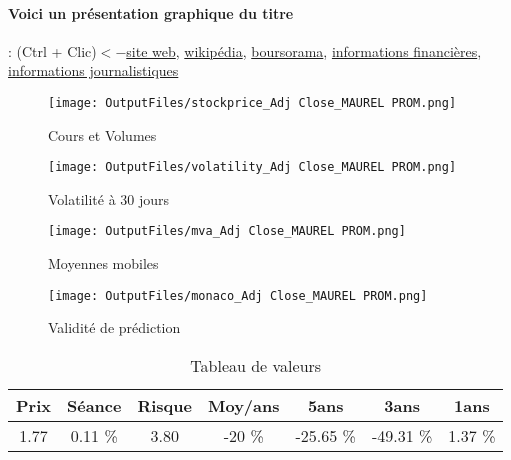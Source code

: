 \documentclass[11pt,a4paper]{report}%
\begin{document}
\paragraph{Voici un présentation graphique du titre} : (Ctrl + Clic)$<-$\href{https://www.maureletprom.fr/fr/}{site web}, \href{https://fr.wikipedia.org/wiki/Maurel_%26_Prom}{wikipédia}, \href{https://www.boursorama.com/cours/1rPMAU}{boursorama}, \href{https://www.qwant.com/?q=site:https:%2f%2fwww.easybourse.com%2faction-societe%2fMAUREL-PROM&t=web&client=ext-firefox-hp}{informations financières}, \href{https://bourse.lerevenu.com/cours-de-bourse/fiche-valeur-synthese/MAUREL-PROM/MAU-FR}{informations journalistiques}
\begin{figure}[!htb]
   \begin{minipage}{0.5\textwidth}
     \centering
     \texttt{[image: OutputFiles/stockprice\_Adj Close\_MAUREL PROM.png]}
     \caption{Cours et Volumes}\label{Fig:price_MAUREL PROM}
   \end{minipage}\hfill
   \begin{minipage}{0.5\textwidth}
     \centering
     \texttt{[image: OutputFiles/volatility\_Adj Close\_MAUREL PROM.png]}
     \caption{Volatilité à 30 jours}\label{Fig:volat_MAUREL PROM}
   \end{minipage}
\end{figure}
\begin{figure}[!htb]
   \begin{minipage}{0.5\textwidth}
     \centering
     \texttt{[image: OutputFiles/mva\_Adj Close\_MAUREL PROM.png]}
     \caption{Moyennes mobiles}\label{Fig:mva_MAUREL PROM}
   \end{minipage}\hfill
   \begin{minipage}{0.5\textwidth}
     \centering
     \texttt{[image: OutputFiles/monaco\_Adj Close\_MAUREL PROM.png]}
     \caption{Validité de prédiction}\label{Fig:prediction_MAUREL PROM}
   \end{minipage}
\end{figure}

\begin{table}[H]
  \centering
    \begin{tabular}{|c|c|c|c|c|c|c|}
    \hline
    Prix & Séance & Risque  & Moy/ans & 5ans & 3ans & 1ans \\
    \hline
    1.77 &    0.11 \%    & 3.80 & -20 \% & -25.65 \% & -49.31 \% & 1.37 \% \\
    \hline
    \end{tabular}%
        \label{tab:table_MAUREL PROM}%
      \caption{Tableau de valeurs}
\end{table}%
\end{document}
